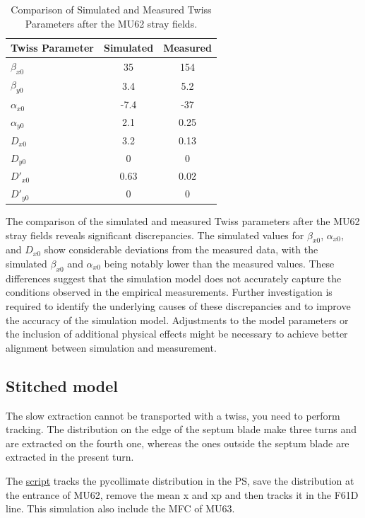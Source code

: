 \begin{table}[ht]
    \centering
    \caption{Comparison of Simulated and Measured Twiss Parameters after the MU62 stray fields.}
    \begin{tabular}{l c c}
        \hline
        \textbf{Twiss Parameter} & \textbf{Simulated} & \textbf{Measured} \\
        \hline
        $\beta_{x0}$ & 35 & 154 \\
        $\beta_{y0}$ & 3.4 & 5.2 \\
        $\alpha_{x0}$ & -7.4 & -37 \\
        $\alpha_{y0}$ & 2.1 & 0.25 \\
        $D_{x0}$ & 3.2 & 0.13 \\
        $D_{y0}$ & 0 & 0 \\
        $D'_{x0}$ & 0.63 & 0.02 \\
        $D'_{y0}$ & 0 & 0 \\
        \hline
    \end{tabular}
    \label{tab:twiss_comparison}
\end{table}

The comparison of the simulated and measured Twiss parameters after the MU62 stray fields reveals significant discrepancies. The simulated values for $\beta_{x0}$, $\alpha_{x0}$, and $D_{x0}$ show considerable deviations from the measured data, with the simulated $\beta_{x0}$ and $\alpha_{x0}$ being notably lower than the measured values. These differences suggest that the simulation model does not accurately capture the conditions observed in the empirical measurements. Further investigation is required to identify the underlying causes of these discrepancies and to improve the accuracy of the simulation model. Adjustments to the model parameters or the inclusion of additional physical effects might be necessary to achieve better alignment between simulation and measurement.

\subsection{Stitched model}

The slow extraction cannot be transported with a twiss, you need to perform tracking. The distribution on the edge of the septum blade make three turns and are extracted on the fourth one, whereas the ones outside the septum blade are extracted in the present turn.

The \href{https://gitlab.cern.ch/eljohnso/acc-models-tls-eliott-fork/-/blob/EliottBranch/ps_extraction/east-fast-extraction/stitched_slow_extraction_east_PTC_single_turn.ipynb}{script} tracks the pycollimate distribution in the PS, save the distribution at the entrance of MU62, remove the mean x and xp and then tracks it in the F61D line. This simulation also include the MFC of MU63.


